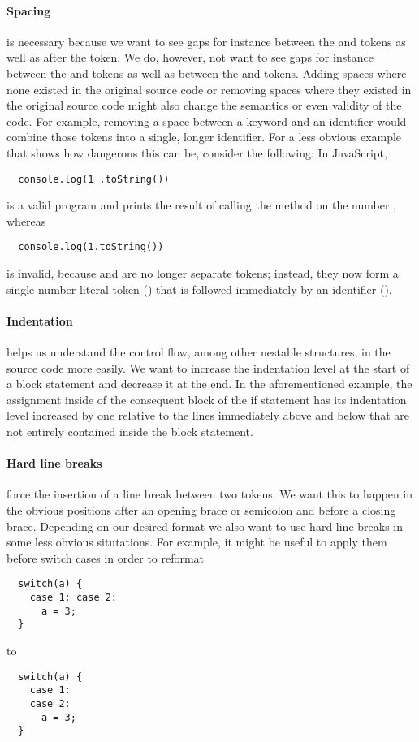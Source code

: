 \paragraph{Spacing} is necessary because we want to see gaps for instance
between the  and \code{==} tokens as well as after the \code{)} token.
We do, however, not want to see gaps for instance
between the \code{(} and  tokens as well as between the  and \code{;} tokens.
Adding spaces where none existed in the original source code
or removing spaces where they existed in the original source code
might also change the semantics or even validity of the code.
For example, removing a space between a keyword and an identifier
would combine those tokens into a single, longer identifier.
For a less obvious example that shows how dangerous this can be, consider the following: In JavaScript,
\begin{verbatim}
  console.log(1 .toString())
\end{verbatim}
is a valid program and prints the result of
calling the method  on the number , whereas
\begin{verbatim}
  console.log(1.toString())
\end{verbatim}
is invalid, because  and  are no longer separate tokens;
instead, they now form a single number literal token ()
that is followed immediately by an identifier ().

\paragraph{Indentation} helps us understand the control flow,
among other nestable structures, in the source code more easily.
We want to increase the indentation level at the start of a block statement and decrease it at the end.
In the aforementioned example, the assignment inside of the consequent block of the if statement
has its indentation level increased by one relative to the lines immediately above and below
that are not entirely contained inside the block statement.

\paragraph{Hard line breaks} force the insertion of a line break between two tokens.
We want this to happen in the obvious positions after an opening brace or semicolon and before a closing brace.
Depending on our desired format we also want to use hard line breaks in some less obvious situtations.
For example, it might be useful to apply them before switch cases in order to reformat
\begin{verbatim}
  switch(a) {
    case 1: case 2:
      a = 3;
  }
\end{verbatim}
to
\begin{verbatim}
  switch(a) {
    case 1:
    case 2:
      a = 3;
  }
\end{verbatim}

